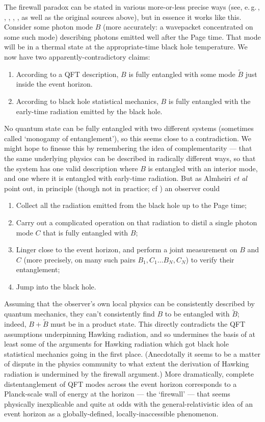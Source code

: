 \documentclass[12pt]{article}
\newcommand{\egc}{\mbox{e.\,g.\,}}
\begin{document}
The firewall paradox can be stated in various more-or-less precise ways (see, \egc, , , , ,  as well as the original sources above), but in essence it works like this. Consider some photon mode $B$ (more accurately: a wavepacket concentrated on some such mode) describing photons emitted well after the Page time. That mode will be in a thermal state at the appropriate-time black hole temperature. We now have two apparently-contradictory claims:
\begin{enumerate}
\item According to a QFT description, $B$ is fully entangled with some mode $\tilde B$ just inside the event horizon.
\item According to black hole statistical mechanics, $B$ is fully entangled with the early-time radiation emitted by the black hole.
\end{enumerate}
No quantum state can be fully entangled with two different systems (sometimes called `monogamy of entanglement'), so this seems close to a contradiction. We might hope to finesse this by remembering the idea of complementarity --- that the same underlying physics can be described in radically different ways, so that the system has one valid description where $B$ is entangled with an interior mode, and one where it is entangled with early-time radiation. But as Almheiri \emph{et al} point out, in principle (though not in practice; cf ) an observer could
\begin{enumerate}
\item Collect all the radiation emitted from the black hole up to the Page time;
\item Carry out a complicated operation on that radiation to distil a single photon mode $C$ that is fully entangled with $B$;
\item Linger close to the event horizon, and perform a joint measurement on $B$ and $C$ (more precisely, on many such pairs $B_1,C_1 \ldots B_N,C_N$) to verify their entanglement;
\item Jump into the black hole.
\end{enumerate}
Assuming that the observer's own local physics can be consistently described by quantum mechanics, they can't consistently find $B$ to be entangled with $\tilde B$; indeed, $B+\tilde B$ must be in a product state. This directly contradicts the QFT assumptions underpinning Hawking radiation, and so undermines the basis of at least some of the arguments for Hawking radiation which got black hole statistical mechanics going in the first place. (Anecdotally it seems to be a matter of dispute in the physics community to what extent the derivation of Hawking radiation is undermined by the firewall argument.) More dramatically, complete distentanglement of QFT modes across the event horizon corresponds to a Planck-scale wall of energy at the horizon --- the `firewall' --- that seems physically inexplicable and quite at odds with the general-relativistic idea of an event horizon as a globally-defined, locally-inaccessible phenomenon. 
\end{document}
